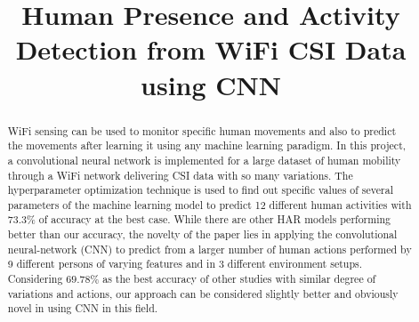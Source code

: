 \documentclass[conference]{IEEEtran}
\begin{document}
\title{Human Presence and Activity Detection from WiFi CSI Data using CNN\\
}

\author{
\and
{}
\and
{}
}

\maketitle

\begin{abstract}
WiFi sensing can be used to monitor specific human movements and also to predict the movements after learning it using any machine learning paradigm. In this project, a convolutional neural network is implemented for a large dataset of human mobility through a WiFi network delivering CSI data with so many variations. The hyperparameter optimization technique is used to find out specific values of several parameters of the machine learning model to predict 12 different human activities with $73.3\%$ of accuracy at the best case. While there are other HAR models performing better than our accuracy, the novelty of the paper lies in applying the convolutional neural-network (CNN) to predict from a larger number of human actions performed by 9 different persons of varying features and in 3 different environment setups. Considering $69.78\%$ as the best accuracy of other studies with similar degree of variations and actions, our approach can be considered slightly better and obviously novel in using CNN in this field.
\end{abstract}
\end{document}
